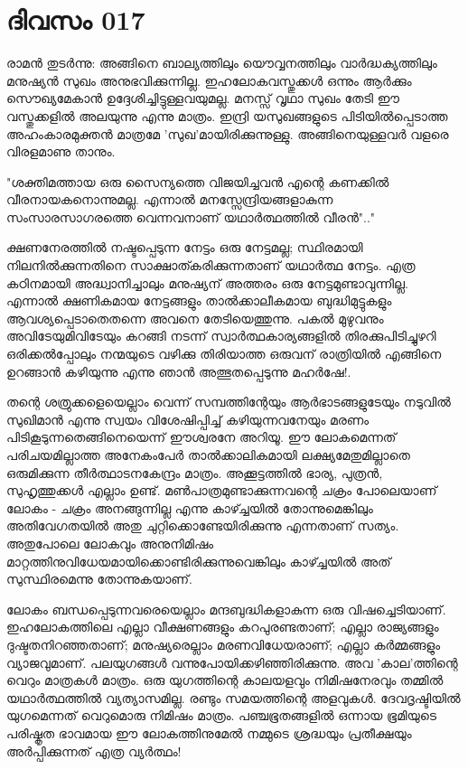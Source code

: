  
\section{ദിവസം 017}



രാമന്‍ തുടര്‍ന്നു: അങ്ങിനെ ബാല്യത്തിലും യൌവ്വനത്തിലും വാര്‍ദ്ധക്യത്തിലും മനുഷ്യന്‍ സുഖം അനുഭവിക്കുന്നില്ല. ഇഹലോകവസ്തുക്കള്‍ ഒന്നും ആര്‍ക്കും സൌഖ്യമേകാന്‍ ഉദ്ദേശിച്ചിട്ടുള്ളവയുമല്ല. മനസ്സ്‌ വൃഥാ സുഖം തേടി ഈ വസ്തുക്കളില്‍ അലയുന്നു എന്നു മാത്രം. ഇന്ദ്രി യസുഖങ്ങളുടെ പിടിയില്‍പ്പെടാത്ത അഹംകാരമുക്തന്‍ മാത്രമേ 'സുഖ'മായിരിക്കുന്നുള്ളു. അങ്ങിനെയുള്ളവര്‍ വളരെ വിരളമാണു താനും. 

"ശക്തിമത്തായ ഒരു സൈന്യത്തെ വിജയിച്ചവന്‍ എന്റെ കണക്കില്‍ വീരനായകനൊന്നുമല്ല. എന്നാല്‍ മനസ്സേന്ദ്രിയങ്ങളാകുന്ന സംസാരസാഗരത്തെ വെന്നവനാണ്‌ യഥാര്‍ത്ഥത്തില്‍ വീരന്‍".." 

ക്ഷണനേരത്തില്‍ നഷ്ടപ്പെടുന്ന നേട്ടം ഒരു നേട്ടമല്ല; സ്ഥിരമായി നിലനില്‍ക്കുന്നതിനെ സാക്ഷാത്കരിക്കുന്നതാണ്‌ യഥാര്‍ത്ഥ നേട്ടം. എത്ര കഠിനമായി അദ്ധ്വാനിച്ചാലും മനുഷ്യന്‌ അത്തരം ഒരു നേട്ടമുണ്ടാവുന്നില്ല. എന്നാല്‍ ക്ഷണികമായ നേട്ടങ്ങളും താല്‍ക്കാലീകമായ ബുദ്ധിമുട്ടുകളും ആവശ്യപ്പെടാതെതന്നെ അവനെ തേടിയെത്തുന്നു. പകല്‍ മുഴുവനും അവിടേയുമിവിടേയും കറങ്ങി നടന്ന് സ്വാര്‍ത്ഥകാര്യങ്ങളില്‍ തിരക്കുപിടിച്ചുഴറി ഒരിക്കല്‍പ്പോലും നന്മയുടെ വഴിക്കു തിരിയാത്ത ഒരുവന്‌ രാത്രിയില്‍ എങ്ങിനെ ഉറങ്ങാന്‍ കഴിയുന്നു എന്നു ഞാന്‍ അത്ഭുതപ്പെടുന്നു മഹര്‍ഷേ!.

തന്റെ ശത്രുക്കളെയെല്ലാം വെന്ന് സമ്പത്തിന്റേയും ആര്‍ഭാടങ്ങളുടേയും നടുവില്‍ സുഖിമാന്‍ എന്നു സ്വയം വിശേഷിപ്പിച്ച്‌ കഴിയുന്നവനേയും മരണം പിടികൂടുന്നതെങ്ങിനെയെന്ന് ഈശ്വരനേ അറിയൂ. ഈ ലോകമെന്നത്‌ പരിചയമില്ലാത്ത അനേകംപേര്‍ താല്‍ക്കാലികമായി ലക്ഷ്യമേതുമില്ലാതെ ഒരുമിക്കുന്ന തീര്‍ത്ഥാടനകേന്ദ്രം മാത്രം. അക്കൂട്ടത്തില്‍ ഭാര്യ, പുത്രന്‍, സുഹൃത്തുക്കള്‍ എല്ലാം ഉണ്ട്‌. മണ്‍പാത്രമുണ്ടാക്കുന്നവന്റെ ചക്രം പോലെയാണ്‌ ലോകം - ചക്രം അനങ്ങുന്നില്ല എന്നു കാഴ്ച്ചയില്‍ തോന്നുമെങ്കിലും അതിവേഗതയില്‍ അതു ചുറ്റിക്കൊണ്ടേയിരിക്കുന്നു എന്നതാണ്‌ സത്യം. അതുപോലെ ലോകവും അനുനിമിഷം മാറ്റത്തിനുവിധേയമായിക്കൊണ്ടിരിക്കുന്നുവെങ്കിലും കാഴ്ച്ചയില്‍ അത്‌ സുസ്ഥിരമെന്നു തോന്നുകയാണ്‌.

ലോകം ബന്ധപ്പെടുന്നവരെയെല്ലാം മന്ദബുദ്ധികളാകുന്ന ഒരു വിഷച്ചെടിയാണ്‌. ഇഹലോകത്തിലെ എല്ലാ വീക്ഷണങ്ങളും കറപുരണ്ടതാണ്‌; എല്ലാ രാജ്യങ്ങളും ദുഷ്ടതനിറഞ്ഞതാണ്‌; മനുഷ്യരെല്ലാം മരണവിധേയരാണ്‌; എല്ലാ കര്‍മ്മങ്ങളും വ്യാജവുമാണ്‌. പലയുഗങ്ങള്‍ വന്നുപോയിക്കഴിഞ്ഞിരിക്കുന്നു. അവ 'കാല'ത്തിന്റെ വെറും മാത്രകള്‍ മാത്രം. ഒരു യുഗത്തിന്റെ കാലയളവും നിമിഷനേരവും തമ്മില്‍ യഥാര്‍ത്ഥത്തില്‍ വ്യത്യാസമില്ല. രണ്ടും സമയത്തിന്റെ അളവുകള്‍. ദേവദൃഷ്ടിയില്‍ യുഗമെന്നത്‌ വെറുമൊരു നിമിഷം മാത്രം. പഞ്ചഭൂതങ്ങളില്‍ ഒന്നായ ഭൂമിയുടെ പരിഷ്കൃത ഭാവമായ ഈ ലോകത്തിനുമേല്‍ നമ്മുടെ ശ്രദ്ധയും പ്രതീക്ഷയും അര്‍പ്പിക്കുന്നത്‌ എത്ര വ്യര്‍ത്ഥം! 

